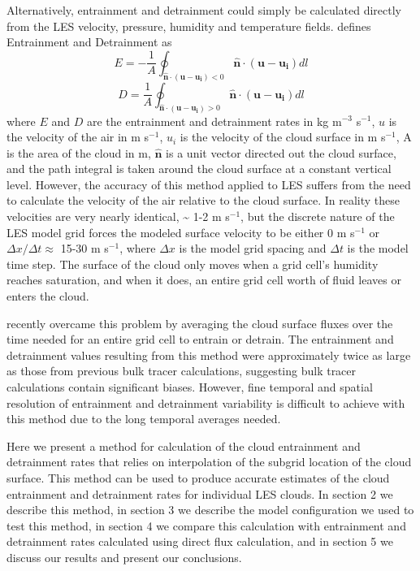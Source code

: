 \documentclass[12pt]{article}
\begin{document}
Alternatively, entrainment and detrainment could simply be calculated directly 
from the LES velocity, pressure, humidity and temperature fields.  
\cite{Siebesma1998} defines Entrainment and Detrainment as
\begin{equation}
E = -\frac{1}{A}\oint_{\mathbf{\hat{n}}\cdot(\mathbf{u} - \mathbf{u_i}) < 0}
\mathbf{\hat{n}}\cdot(\mathbf{u}-\mathbf{u_i})dl
\end{equation}
\begin{equation}
D = \frac{1}{A}\oint_{\mathbf{\hat{n}}\cdot(\mathbf{u} - \mathbf{u_i}) > 0}
\mathbf{\hat{n}}\cdot(\mathbf{u}-\mathbf{u_i})dl
\end{equation}
where $E$ and $D$ are the entrainment and detrainment rates in kg m$^{-3}$ 
s$^{-1}$, $u$ is the velocity of the air in m s$^{-1}$, $u_i$ is the velocity 
of the cloud surface in m s$^{-1}$, A is the area of the cloud in m,
$\mathbf{\hat{n}}$ is a unit vector directed out the cloud surface, and the 
path integral is taken around the cloud surface at a constant vertical level.
However, the accuracy of this method applied to LES suffers from the need to 
calculate the velocity of the air relative to the cloud surface.  In reality 
these velocities are very nearly identical, \textasciitilde{} 1-2 m s$^{-1}$, 
but the discrete nature of the LES model grid forces the modeled surface 
velocity to be either 0 m s$^{-1}$ or $\Delta x / \Delta t \approx$ 
15-30 m s$^{-1}$, where $\Delta x$ is the model grid spacing and $\Delta t$ 
is the model time step.  The surface of the cloud only moves when a grid 
cell's humidity reaches saturation, and when it does, an entire grid cell 
worth of fluid leaves or enters the cloud.

\cite{Romps2010} recently overcame this problem by averaging the cloud surface 
fluxes over the time needed for an entire grid cell to entrain or detrain.  
The entrainment and detrainment values resulting from this method were 
approximately twice as large as those from previous bulk tracer calculations, 
suggesting bulk tracer calculations contain significant biases.  However, fine 
temporal and spatial resolution of entrainment and detrainment variability is 
difficult to achieve with this method due to the long temporal averages needed.

Here we present a method for calculation of the cloud entrainment and 
detrainment rates that relies on interpolation of the subgrid location of 
the cloud surface.  This method can be used to produce accurate estimates of 
the cloud entrainment and detrainment rates for individual LES clouds.  In 
section 2 we describe this method, in section 3 we describe the 
model configuration we used to test this method, in section 4 we compare this 
calculation with entrainment and detrainment rates calculated using 
\cite{Romps2010} direct flux calculation, and in section 5 we discuss 
our results and present our conclusions.  
\end{document}
